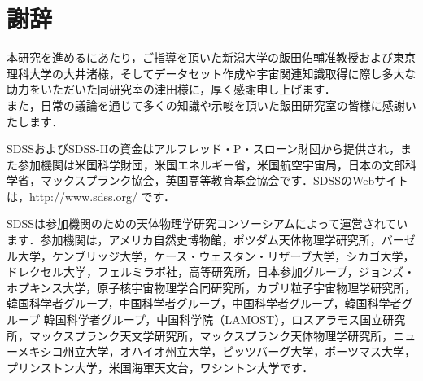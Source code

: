 \documentclass[a4j, 11pt]{jreport}
\begin{document}


\newpage


\newpage
\chapter*{謝辞}
本研究を進めるにあたり，ご指導を頂いた新潟大学の飯田佑輔准教授および東京理科大学の大井渚様，そしてデータセット作成や宇宙関連知識取得に際し多大な助力をいただいた同研究室の津田様に，厚く感謝申し上げます．\\
また，日常の議論を通じて多くの知識や示唆を頂いた飯田研究室の皆様に感謝いたします．

SDSSおよびSDSS-IIの資金はアルフレッド・P・スローン財団から提供され，また参加機関は米国科学財団，米国エネルギー省，米国航空宇宙局，日本の文部科学省，マックスプランク協会，英国高等教育基金協会です．SDSSのWebサイトは，http://www.sdss.org/ です． 

SDSSは参加機関のための天体物理学研究コンソーシアムによって運営されています．参加機関は，アメリカ自然史博物館，ポツダム天体物理学研究所，バーゼル大学，ケンブリッジ大学，ケース・ウェスタン・リザーブ大学，シカゴ大学，ドレクセル大学，フェルミラボ社，高等研究所，日本参加グループ，ジョンズ・ホプキンス大学，原子核宇宙物理学合同研究所，カブリ粒子宇宙物理学研究所，韓国科学者グループ，中国科学者グループ，中国科学者グループ，韓国科学者グループ 韓国科学者グループ，中国科学院（LAMOST），ロスアラモス国立研究所，マックスプランク天文学研究所，マックスプランク天体物理学研究所，ニューメキシコ州立大学，オハイオ州立大学，ピッツバーグ大学，ポーツマス大学，プリンストン大学，米国海軍天文台，ワシントン大学です．
\end{document}
